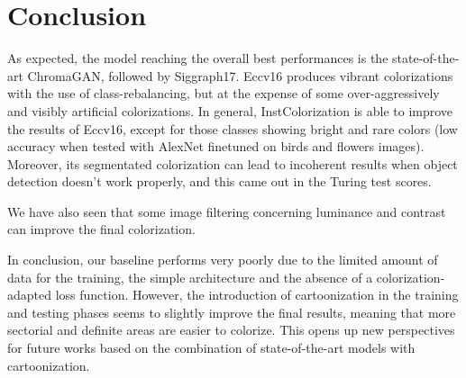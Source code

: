 \section{Conclusion}
As expected, the model reaching the overall best performances is the state-of-the-art ChromaGAN, followed by Siggraph17. Eccv16 produces vibrant colorizations with the use of class-rebalancing, but at
the expense of some over-aggressively and visibly artificial colorizations. In general, InstColorization is able to improve the results of Eccv16, except for those classes showing bright and rare colors (low accuracy when tested with AlexNet finetuned on birds and flowers images). Moreover, its segmentated colorization can lead to incoherent results when object detection doesn't work properly, and this came out in the Turing test scores. 

We have also seen that some image filtering concerning luminance and contrast can improve the final colorization.

In conclusion, our baseline performs very poorly due to the limited amount of data for the training, the simple
architecture and the absence of a colorization-adapted loss function. However, the introduction of cartoonization
in the training and testing phases seems to slightly improve the final results, meaning that more sectorial and
definite areas are easier to colorize. This opens up new perspectives for future works based on the combination
of state-of-the-art models with cartoonization.
